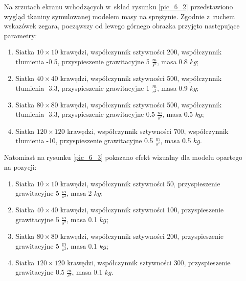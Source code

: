 		Na zrzutach ekranu wchodzących w~skład rysunku \ref{pic_6_2} przedstawiono wygląd tkaniny symulowanej modelem masy na sprężynie. Zgodnie z~ruchem wskazówek zegara, począwszy od lewego górnego obrazka przyjęto następujące parametry:
		
		\begin{enumerate}
			\item Siatka \(10 \times 10\) krawędzi, współczynnik sztywności 200, współczynnik tłumienia -0.5, przyspieszenie grawitacyjne 5 \( \frac{m}{s^2} \), masa 0.8 \(kg\);
			\item Siatka \(40 \times 40\) krawędzi, współczynnik sztywności 500, współczynnik tłumienia -3.3, przyspieszenie grawitacyjne 1 \( \frac{m}{s^2} \), masa 0.9 \(kg\);
			\item Siatka \(80 \times 80\) krawędzi, współczynnik sztywności 500, współczynnik tłumienia -3.3, przyspieszenie grawitacyjne 0.5 \( \frac{m}{s^2} \), masa 0.5 \(kg\);
			\item Siatka \(120 \times 120\) krawędzi, współczynnik sztywności 700, współczynnik tłumienia -10, przyspieszenie grawitacyjne 0.5 \( \frac{m}{s^2} \), masa 0.5 \(kg\).
		\end{enumerate}
		
		Natomiast na rysunku \ref{pic_6_3} pokazano efekt wizualny dla modelu opartego na pozycji:
		
		\begin{enumerate}
			\item Siatka \(10 \times 10\) krawędzi, współczynnik sztywności 50, przyspieszenie grawitacyjne 5 \( \frac{m}{s^2} \), masa 2 \(kg\);
			\item Siatka \(40 \times 40\) krawędzi, współczynnik sztywności 100, przyspieszenie grawitacyjne 5 \( \frac{m}{s^2} \), masa 0.1 \(kg\);
			\item Siatka \(80 \times 80\) krawędzi, współczynnik sztywności 200, przyspieszenie grawitacyjne 5 \( \frac{m}{s^2} \), masa 0.1 \(kg\);
			\item Siatka \(120 \times 120\) krawędzi, współczynnik sztywności 300, przyspieszenie grawitacyjne 0.5 \( \frac{m}{s^2} \), masa 0.1 \(kg\).
		\end{enumerate}
		
			
		
		\pagebreak
		
